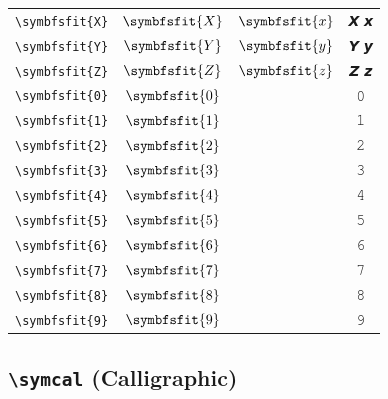 \documentclass[12pt,a4paper]{article}
\begin{document}
\begin{longtable}{|c|c|c|c|}
\verb|\symbfsfit{X}| & $\symbfsfit{X}$ & $\symbfsfit{x}$ & 𝙓 𝙭 \\
\verb|\symbfsfit{Y}| & $\symbfsfit{Y}$ & $\symbfsfit{y}$ & 𝙔 𝙮 \\
\verb|\symbfsfit{Z}| & $\symbfsfit{Z}$ & $\symbfsfit{z}$ & 𝙕 𝙯 \\
\verb|\symbfsfit{0}| & $\symbfsfit{0}$ & & 𝟶 \\
\verb|\symbfsfit{1}| & $\symbfsfit{1}$ & & 𝟷 \\
\verb|\symbfsfit{2}| & $\symbfsfit{2}$ & & 𝟸 \\
\verb|\symbfsfit{3}| & $\symbfsfit{3}$ & & 𝟹 \\
\verb|\symbfsfit{4}| & $\symbfsfit{4}$ & & 𝟺 \\
\verb|\symbfsfit{5}| & $\symbfsfit{5}$ & & 𝟻 \\
\verb|\symbfsfit{6}| & $\symbfsfit{6}$ & & 𝟼 \\
\verb|\symbfsfit{7}| & $\symbfsfit{7}$ & & 𝟽 \\
\verb|\symbfsfit{8}| & $\symbfsfit{8}$ & & 𝟾 \\
\verb|\symbfsfit{9}| & $\symbfsfit{9}$ & & 𝟿 \\
\hline
\end{longtable}

\newpage

\subsection*{\texttt{\textbackslash{}symcal} (Calligraphic)}
\end{document}
